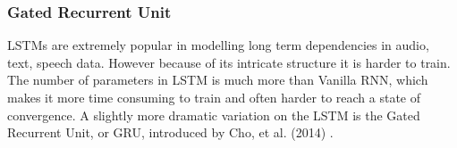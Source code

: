 \documentclass[letterpaper, 10 pt, conference]{ieeeconf}  %
\begin{document}


\subsubsection{Gated Recurrent Unit}

LSTMs are extremely popular in modelling long term dependencies in audio, text, speech data. However because of its intricate structure it is harder to train. The number of parameters in LSTM is much more than Vanilla RNN, which makes it more time consuming to train and often harder to reach a state of convergence. A slightly more dramatic variation on the LSTM is the Gated Recurrent Unit, or GRU, introduced by Cho, et al. (2014) \cite{gru_translation}. 
\end{document}
